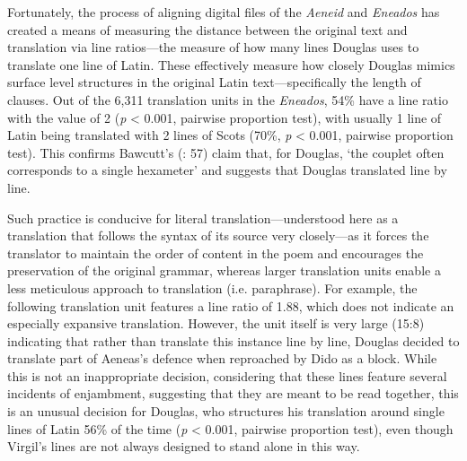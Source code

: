 \documentclass{dhbenelux}
\begin{document}
Fortunately, the process of aligning digital files of the \emph{Aeneid}
and \emph{Eneados} has created a means of measuring the distance between
the original text and translation via line ratios---the measure of how
many lines Douglas uses to translate one line of Latin. These
effectively measure how closely Douglas mimics surface level structures
in the original Latin text---specifically the length of clauses. Out of
the 6,311 translation units in the \emph{Eneados}, 54\% have a line
ratio with the value of 2 (\emph{p} \textless{} 0.001, pairwise
proportion test), with usually 1
line of Latin being translated with 2 lines of Scots (70\%, \emph{p}
\textless{} 0.001, pairwise proportion test). This confirms Bawcutt's (\citeyear{bawcutt1974}: 57) claim that, for Douglas,
`the couplet often corresponds to a single hexameter' and suggests that
Douglas translated line by line.

Such practice is conducive for literal translation---understood here as
a translation that follows the syntax of its source very closely---as it
forces the translator to maintain the order of content in the poem and
encourages the preservation of the original grammar, whereas larger
translation units enable a less meticulous approach to translation (i.e.
paraphrase). For example, the following translation unit features a line
ratio of 1.88, which does not indicate an especially expansive
translation. However, the unit itself is very large (15:8) indicating
that rather than translate this instance line by line, Douglas decided
to translate part of Aeneas's defence when reproached by Dido as a
block. While this is not an inappropriate decision, considering that
these lines feature several incidents of enjambment, suggesting that
they are meant to be read together, this is an unusual decision for
Douglas, who structures his translation around single lines of Latin
56\% of the time (\emph{p} \textless{} 0.001, pairwise proportion test),
even though Virgil's lines are not always designed to stand alone in this way.
\end{document}
